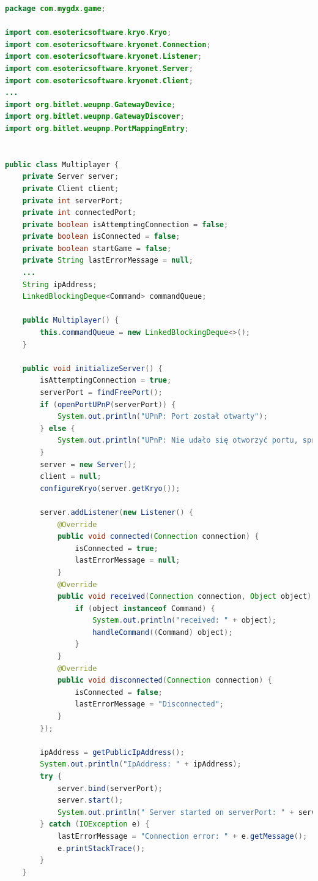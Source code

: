 \begin{lstlisting}[language=Java,style=JavaStyle,label=list:multiplayer,caption=Klasa \texttt{Multiplayer},
                   basicstyle=\footnotesize\ttfamily]
package com.mygdx.game;

import com.esotericsoftware.kryo.Kryo;
import com.esotericsoftware.kryonet.Connection;
import com.esotericsoftware.kryonet.Listener;
import com.esotericsoftware.kryonet.Server;
import com.esotericsoftware.kryonet.Client;
...
import org.bitlet.weupnp.GatewayDevice;
import org.bitlet.weupnp.GatewayDiscover;
import org.bitlet.weupnp.PortMappingEntry;


public class Multiplayer {
    private Server server;
    private Client client;
    private int serverPort;
    private int connectedPort;
    private boolean isAttemptingConnection = false;
    private boolean isConnected = false;
    private boolean startGame = false;
    private String lastErrorMessage = null;
	...
    String ipAddress;
    LinkedBlockingDeque<Command> commandQueue;

    public Multiplayer() {
        this.commandQueue = new LinkedBlockingDeque<>();
    }

    public void initializeServer() {
        isAttemptingConnection = true;
        serverPort = findFreePort();
        if (openPortUPnP(serverPort)) {
            System.out.println("UPnP: Port został otwarty");
        } else {
            System.out.println("UPnP: Nie udało się otworzyć portu, sprawdź konfigurację routera lub ustawienia firewalla");
        }
        server = new Server();
        client = null;
        configureKryo(server.getKryo());

        server.addListener(new Listener() {
            @Override
            public void connected(Connection connection) {
                isConnected = true;
                lastErrorMessage = null;
            }
            @Override
            public void received(Connection connection, Object object) {
                if (object instanceof Command) {
                    System.out.println("received: " + object);
                    handleCommand((Command) object);
                }
            }
            @Override
            public void disconnected(Connection connection) {
                isConnected = false;
                lastErrorMessage = "Disconnected";
            }
        });

        ipAddress = getPublicIpAddress();
        System.out.println("IpAddress: " + ipAddress);
        try {
            server.bind(serverPort);
            server.start();
            System.out.println(" Server started on serverPort: " + serverPort);
        } catch (IOException e) {
            lastErrorMessage = "Connection error: " + e.getMessage();
            e.printStackTrace();
        }
    }


\end{lstlisting}
